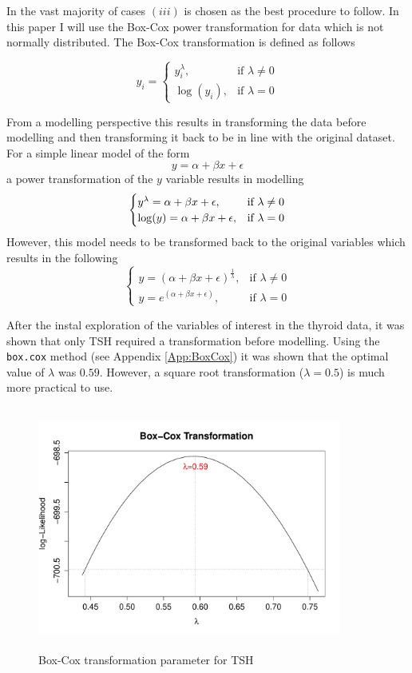 \documentclass[12pt,a4paper]{report}
\begin{document}
In the vast majority of cases $(iii)$ is chosen as the best procedure to follow. In this paper I will use the Box-Cox power transformation for data which is not normally distributed. The Box-Cox transformation is defined as follows

\[
        y_{i}=
        \begin{cases}
        y_{i}^{\lambda},& \text{if } \lambda\neq0\\
        \log(y_{i}),& \text{if } \lambda=0
        \end{cases}
    \]
\vspace{2mm}

From a modelling perspective this results in transforming the data before modelling and then transforming it back to be in line with the original dataset. For a simple linear model of the form
$$y = \alpha + \beta x + \epsilon$$
a power transformation of the $y$ variable results in modelling
\[
    \begin{cases}
    y^{\lambda} = \alpha + \beta x + \epsilon$$, & \text{if } \lambda\neq0\\
    \log(y) = \alpha + \beta x + \epsilon$$, & \text{if } \lambda=0
    \end{cases}
\]
However, this model needs to be transformed back to the original variables which results in the following
\[
    \begin{cases}
    y = (\alpha + \beta x + \epsilon)^{\frac{1}{\lambda}},  & \text{if } \lambda\neq0\\
    y = e^{(\alpha + \beta x + \epsilon)}, & \text{if } \lambda=0
    \end{cases}
\]
\vspace{2mm}

After the instal exploration of the variables of interest in the thyroid data, it was shown that only TSH required a transformation before modelling. Using the {\small\verb"box.cox"} method (see Appendix \ref{App:BoxCox}) it was shown that the optimal value of $\lambda$ was $0.59$. However, a square root transformation ($\lambda=0.5$) is much more practical to use.

\begin{figure}[ht]\centering
    \includegraphics[width=10cm, height=8cm]{BoxCoxTSH.pdf}
    \caption{Box-Cox transformation parameter for TSH}
\end{figure}
\vspace{2mm}
\end{document}
